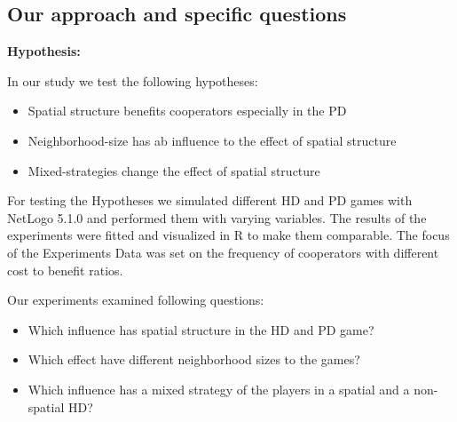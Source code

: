 \subsection{Our approach and specific questions}
\textbf{Hypothesis:}

In our study we test the following hypotheses: 

\begin{itemize}
\item Spatial structure benefits cooperators especially in the PD
\item Neighborhood-size has ab influence to the effect of spatial structure
\item Mixed-strategies change the effect of spatial structure
\end{itemize}

For testing the Hypotheses we simulated different HD and PD games with NetLogo 5.1.0 and performed them with varying variables. The results of the experiments were fitted and visualized in R to make them comparable. The focus of the Experiments Data was set on the frequency of cooperators with different cost to benefit ratios.

Our experiments examined following questions:
\begin{itemize}
\item Which influence has spatial structure in the HD and PD game?
\item Which effect have different neighborhood sizes to the games?
\item Which influence has a mixed strategy of the players in a spatial and a non-spatial HD?
\end{itemize}
